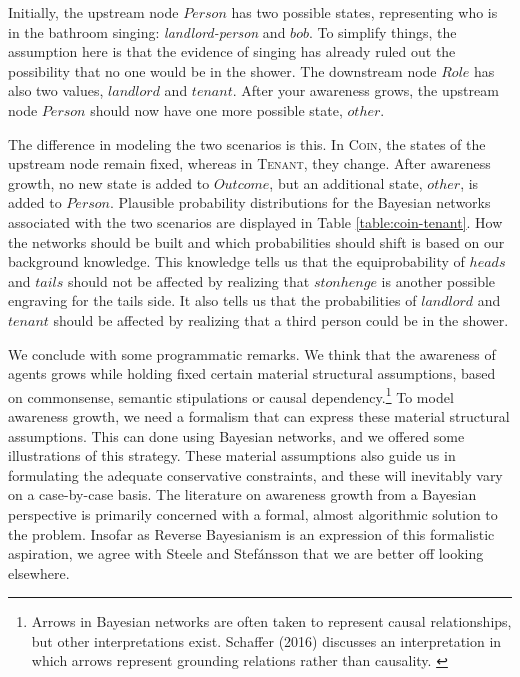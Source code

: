 \documentclass[
  11pt,
  dvipsnames,enabledeprecatedfontcommands]{scrartcl}
\begin{document}
\noindent Initially, the upstream node \(Person\) has two possible
states, representing who is in the bathroom singing:
\textit{landlord-person} and \(bob\). To simplify things, the assumption
here is that the evidence of singing has already ruled out the
possibility that no one would be in the shower. The downstream node
\(Role\) has also two values, \(landlord\) and \(tenant\). After your
awareness grows, the upstream node \(Person\) should now have one more
possible state, \(other\).

The difference in modeling the two scenarios is this. In \textsc{Coin},
the states of the upstream node remain fixed, whereas in
\textsc{Tenant}, they change. After awareness growth, no new state is
added to \(Outcome\), but an additional state, \(other\), is added to
\(Person\). Plausible probability distributions for the Bayesian
networks associated with the two scenarios are displayed in Table
\ref{table:coin-tenant}. How the networks should be built and which
probabilities should shift is based on our background knowledge. This
knowledge tells us that the equiprobability of \(heads\) and \(tails\)
should not be affected by realizing that \(stonhenge\) is another
possible engraving for the tails side. It also tells us that the
probabilities of \(landlord\) and \(tenant\) should be affected by
realizing that a third person could be in the shower.

We conclude with some programmatic remarks. We think that the awareness
of agents grows while holding fixed certain material structural
assumptions, based on commonsense, semantic stipulations or causal
dependency.\footnote{Arrows in Bayesian networks are often taken to
  represent causal relationships, but other interpretations exist.
  Schaffer (2016) discusses an interpretation in which arrows represent
  grounding relations rather than causality. \label{footnote:causation}}
To model awareness growth, we need a formalism that can express these
material structural assumptions. This can done using Bayesian networks,
and we offered some illustrations of this strategy. These material
assumptions also guide us in formulating the adequate conservative
constraints, and these will inevitably vary on a case-by-case basis. The
literature on awareness growth from a Bayesian perspective is primarily
concerned with a formal, almost algorithmic solution to the problem.
Insofar as Reverse Bayesianism is an expression of this formalistic
aspiration, we agree with Steele and Stefánsson that we are better off
looking elsewhere.
\end{document}
